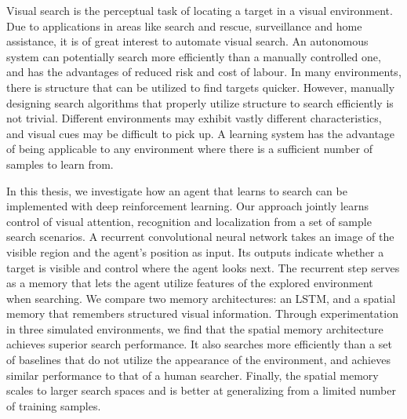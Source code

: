 Visual search is the perceptual task of locating a target in a visual environment.
Due to applications in areas like search and rescue, surveillance and home assistance, it is of great interest to automate visual search.
An autonomous system can potentially search more efficiently than a manually controlled one, and has the advantages of reduced risk and cost of labour.
In many environments, there is structure that can be utilized to find targets quicker.
However, manually designing search algorithms that properly utilize structure to search efficiently is not trivial.
Different environments may exhibit vastly different characteristics, and visual cues may be difficult to pick up.
A learning system has the advantage of being applicable to any environment where there is a sufficient number of samples to learn from.

In this thesis, we investigate how an agent that learns to search can be implemented with deep reinforcement learning.
Our approach jointly learns control of visual attention, recognition and localization from a set of sample search scenarios.
A recurrent convolutional neural network takes an image of the visible region and the agent's position as input.
Its outputs indicate whether a target is visible and control where the agent looks next.
The recurrent step serves as a memory that lets the agent utilize features of the explored environment when searching.
We compare two memory architectures: an LSTM, and a spatial memory that remembers structured visual information.
Through experimentation in three simulated environments, we find that the spatial memory architecture achieves superior search performance.
It also searches more efficiently than a set of baselines that do not utilize the appearance of the environment, and achieves similar performance to that of a human searcher.
Finally, the spatial memory scales to larger search spaces and is better at generalizing from a limited number of training samples.
